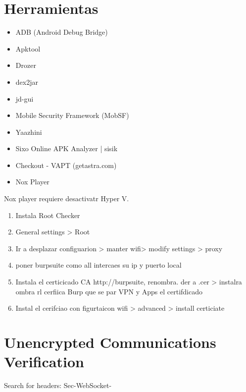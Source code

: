 

\section{Herramientas}

\begin{itemize}
\item ADB (Android Debug Bridge)
\item Apktool
 \item Drozer
 \item dex2jar
 \item jd-gui
 \item Mobile Security Framework (MobSF)
 \item Yaazhini
 \item Sixo Online APK Analyzer | sisik
 \item Checkout - VAPT (getastra.com)
 \item Nox Player
\end{itemize}

Nox player requiere desactivatr Hyper V. 

\begin{enumerate}
	\item Instala Root Checker
 \item General settings > Root
 \item Ir a desplazar configuarion > manter wifi> modify settings > proxy
 \item poner burpsuite como all intercaes su ip y puerto local
 \item Instala el certicicado CA http://burpsuite, renombra. der a .cer > instalra ombra rl cerfiica Burp que se par VPN y Apps el certifdicado
 \item Instal el cerifciao con figurtaicon wifi > advanced > install certiciate
\end{enumerate}


\section{Unencrypted Communications Verification}

Search for headers: Sec-WebSocket- 
